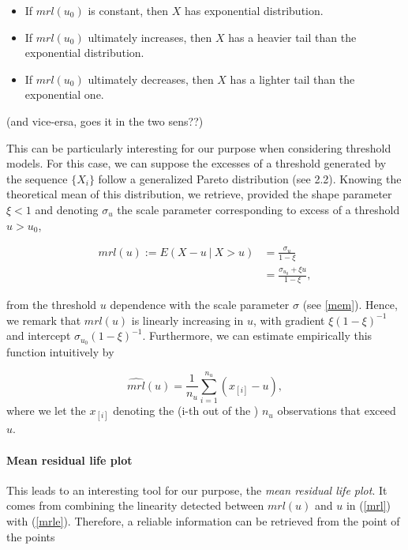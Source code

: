 \documentclass[11pt,a4paper,openany ]{book}
\begin{document}
\begin{itemize}
	\item If $mrl(u_0)$ is constant, then $X$ has exponential distribution.
	\item If $mrl(u_0)$ ultimately increases, then $X$ has a heavier tail than the exponential distribution.
	\item If $mrl(u_0)$ ultimately decreases, then $X$ has a lighter tail than the exponential one.
\end{itemize} (and vice-ersa, goes it in the two sens??)

This can be particularly interesting for our purpose when considering threshold models. For this case, we can suppose the excesses of a threshold generated by the sequence $\{X_i\}$ follow a generalized Pareto distribution (see 2.2). Knowing the theoretical mean of this distribution, we retrieve, provided the shape parameter $\xi<1$ and denoting $\sigma_u$ the scale parameter corresponding to excess of a threshold $u>u_0$,

\begin{equation} \label{mrl}
\begin{aligned}
mrl(u):=E(X-u\ |\ X>u)
& = \frac{\sigma_u}{1-\xi} \\
& = \frac{\sigma_{u_0}+\xi u}{1-\xi},
\end{aligned}
\end{equation}

from the threshold $u$ dependence with the scale parameter $\sigma$ (see \ref{mem}). Hence, we remark that $mrl(u)$ is linearly increasing in $u$, with gradient $\xi(1-\xi)^{-1}$ and intercept $\sigma_{u_0}(1-\xi)^{-1}$. Furthermore, we can estimate empirically this function intuitively by 

\begin{equation}\label{mrle}
\widehat{mrl}(u)=\frac{1}{n_u}\sum_{i=1}^{n_u}(x_{[i]}-u),
\end{equation}
where we let the $x_{[i]}$ denoting the (i-th out of the ) $n_u$ observations that exceed $u$.

\paragraph{Mean residual life plot} This leads to an interesting tool for our purpose, the \emph{mean residual life plot}. It comes from combining the linearity detected between $mrl(u)$ and $u$ in (\ref{mrl}) with (\ref{mrle}). Therefore, a reliable information can be retrieved from the point of the points 
\end{document}
